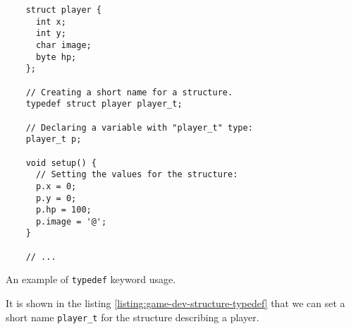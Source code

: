 \documentclass[../sparc.tex]{subfiles}
\begin{document}
\begin{listing}[H]
  \begin{verbatim}
    struct player {
      int x;
      int y;
      char image;
      byte hp;
    };

    // Creating a short name for a structure.
    typedef struct player player_t;

    // Declaring a variable with "player_t" type:
    player_t p;

    void setup() {
      // Setting the values for the structure:
      p.x = 0;
      p.y = 0;
      p.hp = 100;
      p.image = '@';
    }

    // ...
  \end{verbatim}
  \caption{An example of \texttt{typedef} keyword usage.}
  \label{listing:game-dev-structure-typedef}
\end{listing}

It is shown in the listing \ref{listing:game-dev-structure-typedef} that we can
set a short name \texttt{player_t} for the structure describing a
player.
\end{document}
